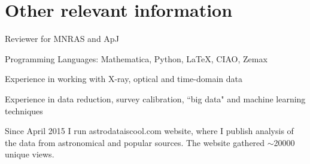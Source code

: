 \documentclass[11pt,letterpaper]{article}
\renewenvironment{itemize}{
  \begin{list}{}{
    \setlength{\leftmargin}{1.5em}
    \setlength{\itemsep}{0.10em}
    \setlength{\parskip}{0pt}
    \setlength{\parsep}{0.10em}
  }
}{
  \end{list}
}
\begin{document}
\section*{Other relevant information}

\begin{itemize}
\item Reviewer for MNRAS and  ApJ
\item Programming Languages: Mathematica, Python, \LaTeX, CIAO, Zemax
\item Experience in working with X-ray, optical and time-domain data
 \item Experience in data reduction, survey calibration, ``big data" and machine learning techniques
\item Since April 2015 I run astrodataiscool.com website, where I publish analysis of the data from \hbox{astronomical} and popular sources. The website gathered $\sim$20000 unique views. 
\end{itemize}


\end{document}
